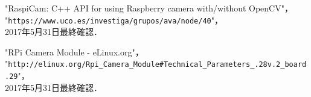 \documentclass[11pt,a4paper]{jsarticle}
\begin{document}
\begin{thebibliography}{9}

    "RaspiCam: C++ API for using Raspberry camera with/without OpenCV"，\\
    "\texttt{https://www.uco.es/investiga/grupos/ava/node/40}"，\\
    2017年5月31日最終確認．

    "RPi Camera Module - eLinux.org"，\\
    "\texttt{http://elinux.org/Rpi\_Camera\_Module\#Technical\_Parameters\_.28v.2\_board.29}"，\\
    2017年5月31日最終確認．

\end{thebibliography}
\end{document}
